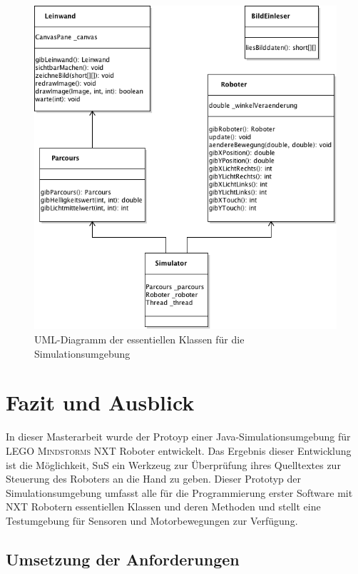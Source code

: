 \documentclass[paper=a4, DIV=14, BCOR=15mm, twoside=on, onecolumn=on, open = right, titlepage =on, parskip =half, headsepline = on, footsepline = on, chapterprefix = on, appendixprefix = off, fontsize = 12pt, numbers = noenddot, abstract = on]{scrbook}
\begin{document}
\begin{figure}[htbp]
\centering
\includegraphics[scale=0.7]{images/uml_simulator_essenz.png}
\caption{UML-Diagramm der essentiellen Klassen für die Simulationsumgebung}
\label{fig:simulator_uml}
\end{figure}


\newpage
\chapter{Fazit und Ausblick}

\onehalfspacing

In dieser Masterarbeit wurde der Protoyp einer Java-Simulationsumgebung für \textsc{LEGO Mindstorms} NXT Roboter entwickelt. Das Ergebnis dieser Entwicklung ist die Möglichkeit, SuS ein Werkzeug zur Überprüfung ihres Quelltextes zur Steuerung des Roboters an die Hand
zu geben. Dieser Prototyp der Simulationsumgebung umfasst alle für die
Programmierung erster Software mit NXT Robotern essentiellen Klassen und deren Methoden und stellt eine Testumgebung für Sensoren und Motorbewegungen zur Verfügung.


\section{Umsetzung der Anforderungen}
\end{document}
